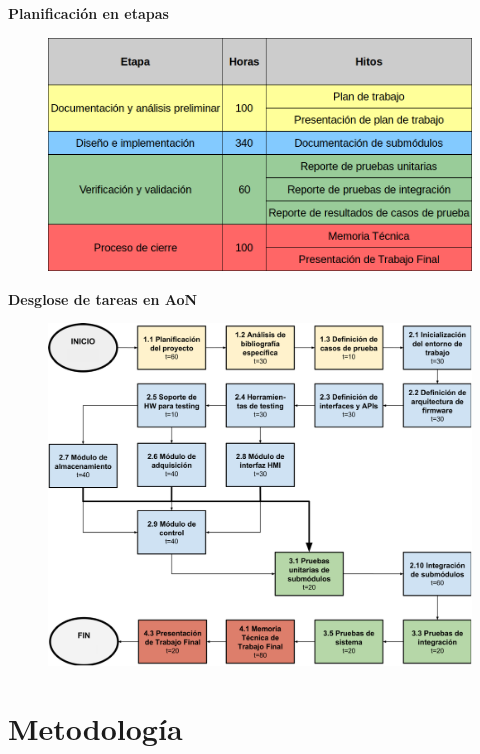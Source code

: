 \documentclass[11pt]{beamer}
\begin{document}
\begin{frame}{\textbf{\LARGE{Planificación en etapas}}}
	\vspace{-.7cm}
	\begin{figure}[H]
		{\includegraphics[width=\textwidth]{./imagenes/planificacion.png}}
	\end{figure}	
\end{frame}

\begin{frame}{\textbf{\LARGE{Desglose de tareas en AoN}}}
	\vspace{-.7cm}
	\begin{figure}[H]
		{\includegraphics[height=.8\textheight]{./imagenes/AoN.pdf}}
	\end{figure}	
\end{frame}


\section{Metodología}
\end{document}
